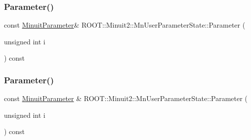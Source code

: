 \subsubsection{\texorpdfstring{Parameter()}{Parameter()}\hspace{0.1cm}{\footnotesize\ttfamily [1/2]}}
{\footnotesize\ttfamily const \mbox{\hyperlink{classROOT_1_1Minuit2_1_1MinuitParameter}{Minuit\+Parameter}}\& R\+O\+O\+T\+::\+Minuit2\+::\+Mn\+User\+Parameter\+State\+::\+Parameter (\begin{DoxyParamCaption}\item[{unsigned int}]{i }\end{DoxyParamCaption}) const}

\mbox{\label{classROOT_1_1Minuit2_1_1MnUserParameterState_a8a3fa916f75abaa442d96ab3af55a5af}} 
\subsubsection{\texorpdfstring{Parameter()}{Parameter()}\hspace{0.1cm}{\footnotesize\ttfamily [2/2]}}
{\footnotesize\ttfamily const \mbox{\hyperlink{classROOT_1_1Minuit2_1_1MinuitParameter}{Minuit\+Parameter}} \& R\+O\+O\+T\+::\+Minuit2\+::\+Mn\+User\+Parameter\+State\+::\+Parameter (\begin{DoxyParamCaption}\item[{unsigned int}]{i }\end{DoxyParamCaption}) const}

